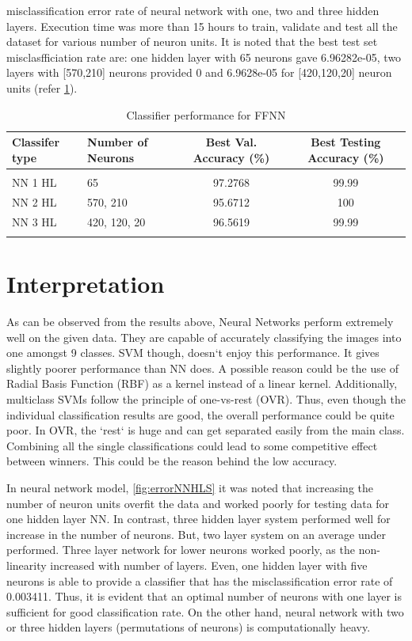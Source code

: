 \documentclass[letterpaper,12pt, onecolumn]{article}%
\begin{document}
misclassification error rate of neural network with one, two and three hidden layers. Execution time was more than 15 hours to train, validate and test all the dataset for various number of neuron units. It is noted that the best test set misclasfficiation rate are: one hidden layer with 65 neurons gave 6.96282e-05, two layers with [570,210] neurons provided 0 and 6.9628e-05 for [420,120,20] neuron units (refer \cref{tab:classifier_performance_ffnn}).

\begin{table}[!htbp]
\centering
 \begin{tabular}{ l l  c c }
 \hline
 Classifer type & Number of Neurons & Best Val. Accuracy (\%) &  Best Testing Accuracy (\%)  \\ [0.5ex]
 \hline\hline \\ [-1.5ex]
	NN 1 HL & 65 & 97.2768 & 99.99  \\ 
	NN 2 HL & 570, 210 &  95.6712 & 100   \\ 
	NN 3 HL & 420, 120, 20 & 96.5619 & 99.99  \\ 
\hline \\ 
 \hline
 \end{tabular}
  	   \caption{Classifier performance for FFNN}
       \label{tab:classifier_performance_ffnn}
\end{table}

\section{Interpretation} \label{sec:interp} %
\noindent
As can be observed from the results above, Neural Networks perform extremely well on the given data. They are capable of accurately classifying the images into one amongst 9 classes. SVM though, doesn`t enjoy this performance. It gives slightly poorer performance than NN does. A possible reason could be the use of Radial Basis Function (RBF) as a kernel instead of a linear kernel. Additionally, multiclass SVMs follow the principle of one-vs-rest (OVR). Thus, even though the individual classification results are good, the overall performance could be quite poor. In OVR, the `rest` is huge and can get separated easily from the main class. Combining all the single classifications could lead to some competitive effect between winners. This could be the reason behind the low accuracy.

In neural network model, \cref{fig:errorNNHLS} it was noted that increasing the number of neuron units overfit the data and worked poorly for testing data for one hidden layer NN. In contrast, three hidden layer system performed well for increase in the number of neurons. But, two layer system on an average under performed. Three layer network for lower neurons worked poorly, as the non-linearity increased with number of layers. Even, one hidden layer with five neurons is able to provide a classifier that has the misclassification error rate of 0.003411. Thus, it is evident that an optimal number of neurons with one layer is sufficient for good classification rate. On the other hand, neural network with two or three hidden layers (permutations of neurons) is computationally heavy.
\end{document}
